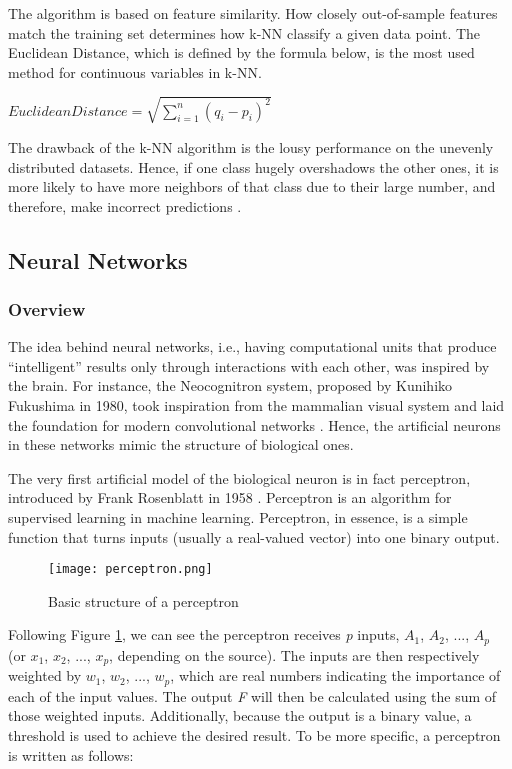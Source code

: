 The algorithm is based on feature similarity. How closely out-of-sample features match the training set determines how k-NN classify a given data point. The Euclidean Distance,  which is defined by the formula below, is the most used method for continuous variables in k-NN.

\begin{center}
$EuclideanDistance =  \sqrt{ \sum_{i=1}^{n}(q_i - p_i)^2 }$
\end{center}

The drawback of the k-NN algorithm is the lousy performance on the unevenly distributed datasets. Hence, if one class hugely overshadows the other ones, it is more likely to have more neighbors of that class due to their large number, and therefore, make incorrect predictions \cite{laaksonen1996classification}.

\subsection{Neural Networks}

\subsubsection{Overview}

The idea behind neural networks, i.e., having computational units that produce “intelligent” results only through interactions with each other, was inspired by the brain. For instance, the Neocognitron system, proposed by Kunihiko Fukushima in 1980, took inspiration from the mammalian visual system and laid the foundation for modern convolutional networks \cite{goodfellow2016deep}. Hence, the artificial neurons in these networks mimic the structure of biological ones. 

The very first artificial model of the biological neuron is in fact perceptron, introduced by Frank Rosenblatt in 1958 \cite{rosenblatt1958perceptron}. Perceptron is an algorithm for supervised learning in machine learning. Perceptron, in essence, is a simple function that turns inputs (usually a real-valued vector) into one binary output.

\begin{figure}[htbp!] 
\centering    
\texttt{[image: perceptron.png]}
\caption{Basic structure of a perceptron \cite{minsky1969perceptron}}
\label{fig:perceptron}
\end{figure}

Following Figure \ref{fig:perceptron}, we can see the perceptron receives \textit{p} inputs, $A_1$, $A_2$, ..., $A_p$ (or $x_1$, $x_2$, ..., $x_p$, depending on the source). The inputs are then respectively weighted by $w_1$, $w_2$, ..., $w_p$, which are real numbers indicating the importance of each of the input values. The output \textit{F} will then be calculated using the sum of those weighted inputs. Additionally, because the output is a binary value, a threshold is used to achieve the desired result. To be more specific, a perceptron is written as follows:

